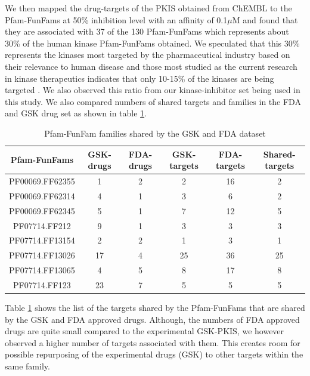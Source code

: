 \documentclass[a4paper, 11pt]{report}
\begin{document}
We then mapped the drug-targets of the PKIS obtained from ChEMBL to the Pfam-FunFams at 50\% inhibition level with an affinity of 0.1$\mu$M and found that they are associated with 37 of the 130 Pfam-FunFams which represents about 30\% of the human kinase Pfam-FunFams obtained. We speculated that this 30\% represents the kinases most targeted by the pharmaceutical industry based on their relevance to human disease and those most studied as the current research in kinase therapeutics indicates that only 10-15\% of the kinases are being targeted \cite{li2016human, elkins2016comprehensive}. We also observed this ratio from our kinase-inhibitor set being used in this study. We also compared numbers of shared targets and families in the FDA and GSK drug set as shown in table \ref{drgfam}.
\begin{table}[H]
\centering
\caption{Pfam-FunFam families shared by the GSK and FDA dataset}
\label{drgfam}
\begin{tabular}{|c|c|c|c|c|c|}
\hline
Pfam-FunFams    & GSK-drugs & FDA-drugs & GSK-targets & FDA-targets & Shared-targets \\ \hline
PF00069.FF62355 & 1   & 2   & 2           & 16          & 2              \\ \hline
PF00069.FF62314 & 4   & 1   & 3           & 6           & 2              \\ \hline
PF00069.FF62345 & 5   & 1   & 7           & 12          & 5              \\ \hline
PF07714.FF212   & 9   & 1   & 3           & 3           & 3              \\ \hline
PF07714.FF13154 & 2   & 2   & 1           & 3           & 1              \\ \hline
PF07714.FF13026 & 17  & 4   & 25          & 36          & 25             \\ \hline
PF07714.FF13065 & 4   & 5   & 8           & 17          & 8              \\ \hline
PF07714.FF123   & 23  & 7   & 5           & 5           & 5              \\ \hline
\end{tabular}
\end{table}
Table \ref{drgfam} shows the list of the targets shared by the Pfam-FunFams that are shared by the GSK and FDA approved drugs. Although, the numbers of FDA approved drugs are quite small compared to the experimental GSK-PKIS, we however observed a higher number of targets associated with them. This creates room for possible repurposing of the experimental drugs (GSK) to other targets within the same family.
\end{document}
